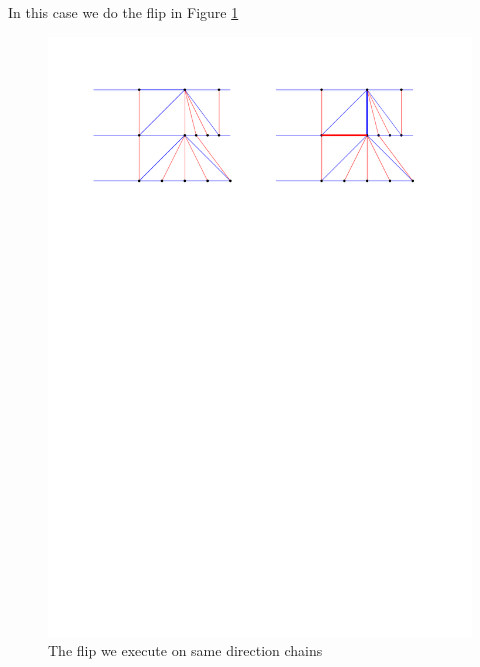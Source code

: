 
  In this case we do the flip in Figure \ref{fig:uni:sameFlip}

  \begin{figure}[h]
    \centering
    \includegraphics[width =\textwidth]{unifiedAlgo/img/post/sameFlip}
    \caption{The flip we execute on same direction chains}
    \label{fig:uni:sameFlip}
  \end{figure}

